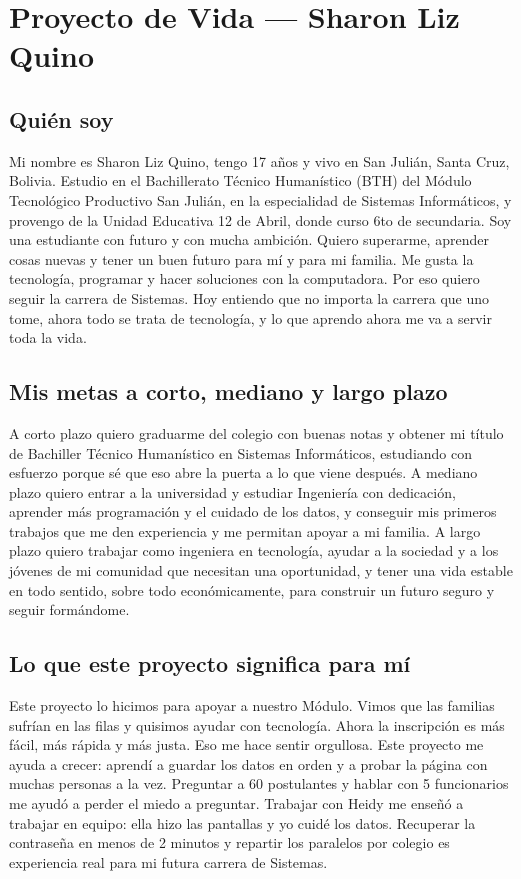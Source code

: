 \section*{Proyecto de Vida --- Sharon Liz Quino}

\subsection*{Quién soy}
Mi nombre es Sharon Liz Quino, tengo 17 años y vivo en San Julián, Santa Cruz, Bolivia. Estudio en el Bachillerato Técnico Humanístico (BTH) del Módulo Tecnológico Productivo San Julián, en la especialidad de Sistemas Informáticos, y provengo de la Unidad Educativa 12 de Abril, donde curso 6to de secundaria. Soy una estudiante con futuro y con mucha ambición. Quiero superarme, aprender cosas nuevas y tener un buen futuro para mí y para mi familia. Me gusta la tecnología, programar y hacer soluciones con la computadora. Por eso quiero seguir la carrera de Sistemas. Hoy entiendo que no importa la carrera que uno tome, ahora todo se trata de tecnología, y lo que aprendo ahora me va a servir toda la vida.

\subsection*{Mis metas a corto, mediano y largo plazo}
A corto plazo quiero graduarme del colegio con buenas notas y obtener mi título de Bachiller Técnico Humanístico en Sistemas Informáticos, estudiando con esfuerzo porque sé que eso abre la puerta a lo que viene después. A mediano plazo quiero entrar a la universidad y estudiar Ingeniería con dedicación, aprender más programación y el cuidado de los datos, y conseguir mis primeros trabajos que me den experiencia y me permitan apoyar a mi familia. A largo plazo quiero trabajar como ingeniera en tecnología, ayudar a la sociedad y a los jóvenes de mi comunidad que necesitan una oportunidad, y tener una vida estable en todo sentido, sobre todo económicamente, para construir un futuro seguro y seguir formándome.

\subsection*{Lo que este proyecto significa para mí}
Este proyecto lo hicimos para apoyar a nuestro Módulo. Vimos que las familias sufrían en las filas y quisimos ayudar con tecnología. Ahora la inscripción es más fácil, más rápida y más justa. Eso me hace sentir orgullosa. Este proyecto me ayuda a crecer: aprendí a guardar los datos en orden y a probar la página con muchas personas a la vez. Preguntar a 60 postulantes y hablar con 5 funcionarios me ayudó a perder el miedo a preguntar. Trabajar con Heidy me enseñó a trabajar en equipo: ella hizo las pantallas y yo cuidé los datos. Recuperar la contraseña en menos de 2 minutos y repartir los paralelos por colegio es experiencia real para mi futura carrera de Sistemas.
